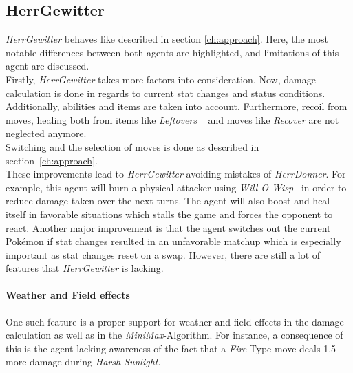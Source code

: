 \subsection{HerrGewitter}
\label{sec:HerrGewitter}
\textit{HerrGewitter} behaves like described in section \ref{ch:approach}. Here, the most notable
differences between both agents are highlighted, and limitations of this agent are discussed. \\
Firstly, \textit{HerrGewitter} takes more factors into consideration. Now, damage calculation is done
in regards to current stat changes and status conditions. Additionally, abilities and items are taken 
into account. Furthermore, recoil from moves, healing both from items
like \textit{Leftovers} ~\autocite{Bulbapedia:Leftovers} and moves like \textit{Recover} are not neglected
anymore. \\
Switching and the selection of moves is done as described in section~\ref{ch:approach}. \\
These improvements lead to \textit{HerrGewitter} avoiding mistakes of \textit{HerrDonner}. For example,
this agent will burn a physical attacker using \textit{Will-O-Wisp}~\autocite{Bulbapedia:WillOWisp}
in order to reduce damage taken over the next turns. The agent will also boost and heal itself in favorable
situations which stalls the game and forces the opponent to react. Another major improvement is that the
agent switches out the current Pokémon if stat changes resulted in an unfavorable matchup which is especially
important as stat changes reset on a swap. However, there are still a lot of features that \textit{HerrGewitter} 
is lacking. 

\paragraph{Weather and Field effects}
One such feature is a proper support for weather and field effects in the damage calculation as well
as in the \textit{MiniMax}-Algorithm. For instance, a consequence of this is the agent lacking awareness
of the fact that a \textit{Fire}-Type move deals 1.5 more damage during \textit{Harsh Sunlight}.

